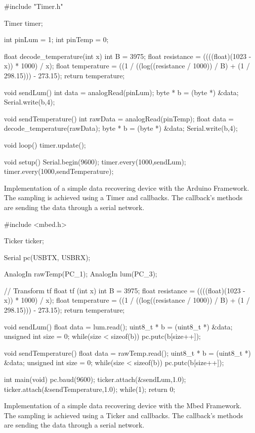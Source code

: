 \begin{listing}[H]
  \centering
\begin{scalacode}
#include "Timer.h"

Timer timer;

int pinLum = 1;
int pinTemp = 0;

float decode_temperature(int x){
  int B = 3975;
  float resistance = ((((float)(1023 - x)) * 1000) / x);
  float temperature = ((1 / ((log((resistance / 1000)) / B) + (1 / 298.15))) - 273.15);
  return temperature;
}

void sendLum(){
  int data = analogRead(pinLum);
  byte * b = (byte *) &data;
  Serial.write(b,4);
}

void sendTemperature(){
  int rawData = analogRead(pinTemp);
  float data = decode_temperature(rawData);
  byte * b = (byte *) &data;
  Serial.write(b,4);
}

void loop() {
  timer.update();
}

void setup() {
  Serial.begin(9600);
  timer.every(1000,sendLum);
  timer.every(1000,sendTemperature);
}
\end{scalacode}
  \caption[Arduino code for a simple data recovering]{Implementation of a simple
data recovering device with the Arduino Framework. The sampling is achieved
using a Timer and callbacks. The callback's methods are sending the data through a
serial network.}
  \label{lst:arduino_generalisation}
\end{listing}

\begin{listing}[H]
  \centering
\begin{scalacode}
#include <mbed.h>

Ticker ticker;

Serial pc(USBTX, USBRX);

AnalogIn rawTemp(PC_1);
AnalogIn lum(PC_3);

 // Transform tf
float tf (int x){
  int B = 3975;
  float resistance = ((((float)(1023 - x)) * 1000) / x);
  float temperature = ((1 / ((log((resistance / 1000)) / B) + (1 / 298.15))) - 273.15);
  return temperature;
}

void sendLum(){
  float data = lum.read();
  uint8_t * b = (uint8_t *) &data;
  unsigned int size = 0;
  while(size < sizeof(b)) {
      pc.putc(b[size++]);
  }
}

void sendTemperature(){
  float data = rawTemp.read();
  uint8_t * b = (uint8_t *) &data;
  unsigned int size = 0;
  while(size < sizeof(b)) {
    pc.putc(b[size++]);
  }
}

int main(void) {
  pc.baud(9600);
  ticker.attach(&sendLum,1.0);
  ticker.attach(&sendTemperature,1.0);
  while(1);
  return 0;
}
\end{scalacode}
  \caption[Mbed code for a simple data recovering]{Implementation of a simple
data recovering device with the Mbed Framework. The sampling is achieved
using a Ticker and callbacks. The callback's methods are sending the data through a
serial network.}
  \label{lst:mbed_generalisation}
\end{listing}

